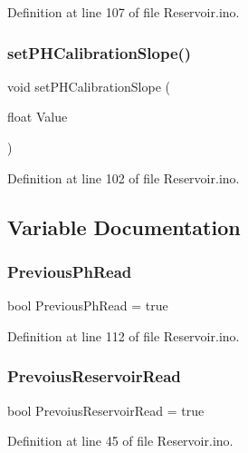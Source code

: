 Definition at line 107 of file Reservoir.\+ino.

\mbox{\label{_reservoir_8ino_a5a85422c02ae9a0c18492be078fab45a}} 
\subsubsection{\texorpdfstring{setPHCalibrationSlope()}{setPHCalibrationSlope()}}
{\footnotesize\ttfamily void set\+P\+H\+Calibration\+Slope (\begin{DoxyParamCaption}\item[{float}]{Value }\end{DoxyParamCaption})}



Definition at line 102 of file Reservoir.\+ino.



\subsection{Variable Documentation}
\mbox{\label{_reservoir_8ino_aa4f528ca2547773eeb1bd328e0b4ecae}} 
\subsubsection{\texorpdfstring{PreviousPhRead}{PreviousPhRead}}
{\footnotesize\ttfamily bool Previous\+Ph\+Read = true}



Definition at line 112 of file Reservoir.\+ino.

\mbox{\label{_reservoir_8ino_ad545309f7f16bb9eb70b9b7754376a10}} 
\subsubsection{\texorpdfstring{PrevoiusReservoirRead}{PrevoiusReservoirRead}}
{\footnotesize\ttfamily bool Prevoius\+Reservoir\+Read = true}



Definition at line 45 of file Reservoir.\+ino.

